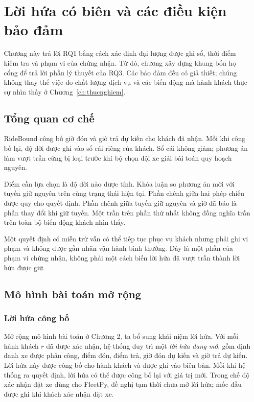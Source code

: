 \chapter{Lời hứa có biên và các điều kiện bảo đảm}\label{ch:phuongphap}

Chương này trả lời RQ1 bằng cách xác định đại lượng được ghi sổ, thời điểm kiểm tra và phạm vi
của chứng nhận. Từ đó, chương xây dựng khung bốn họ cổng để trả lời phần lý thuyết của RQ3.
Các bảo đảm đều có giả thiết; chúng không thay thế việc đo chất lượng dịch vụ và các biến động
mà hành khách thực sự nhìn thấy ở Chương~\ref{ch:thucnghiem}.

\section{Tổng quan cơ chế}

RideBound công bố giờ đón và giờ trả dự kiến cho khách đã nhận. Mỗi khi công bố lại, độ dời
được ghi vào sổ cái riêng của khách. Sổ cái không giảm; phương án làm vượt trần cứng bị loại
trước khi bộ chọn đội xe giải bài toán quy hoạch nguyên.

Điểm cần lựa chọn là độ dời nào được tính. Khóa luận so phương án mới với tuyến giữ nguyên
trên cùng trạng thái hiện tại. Phần chênh giữa hai phép chiếu được quy cho quyết định. Phần
chênh giữa tuyến giữ nguyên và giờ đã báo là phần thay đổi khi giữ tuyến. Một trần trên phần
thứ nhất không đồng nghĩa trần trên toàn bộ biến động khách nhìn thấy.

Một quyết định có miễn trừ vẫn có thể tiếp tục phục vụ khách nhưng phải ghi vi phạm và không
được gắn nhãn vận hành bình thường. Đây là một phần của phạm vi chứng nhận, không phải một
cách biến lời hứa đã vượt trần thành lời hứa được giữ.

\section{Mô hình bài toán mở rộng}

\subsection{Lời hứa công bố}

Mở rộng mô hình bài toán ở Chương 2, ta bổ sung khái niệm lời hứa. Với mỗi hành khách $r$ đã được xác nhận,
hệ thống duy trì một \emph{lời hứa đang mở}, gồm định danh xe được phân công, điểm đón, điểm
trả, giờ đón dự kiến và giờ trả dự kiến. Lời hứa này được công bố cho hành khách và được ghi
vào biên bản. Mỗi khi hệ thống ra quyết định, lời hứa có thể được công bố lại với giá trị mới.
Trong chế độ xác nhận đặt xe dùng cho FleetPy, đề nghị tạm thời chưa mở lời hứa; mốc đầu
được ghi khi khách xác nhận đặt xe.

